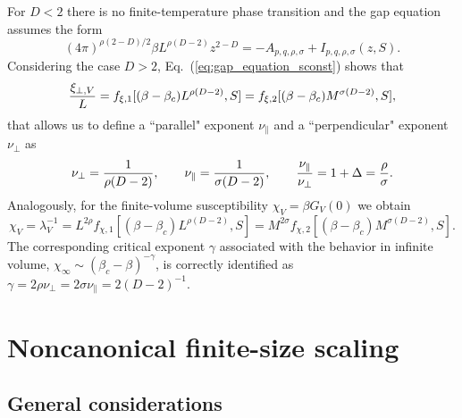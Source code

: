 \documentclass[a4paper,12pt]{article}
\begin{document}
For $D<2$ there is no finite-temperature phase transition and the gap equation
assumes the form
\begin{equation}
\label{eq:gap_equation_sconst2}
(4\pi)^{\rho(2-D)/2}  \beta L^{\rho(D-2)} z^{2-D} =
- A_{p,q,\rho,\sigma} + I_{p,q,\rho,\sigma}(z,S).
\end{equation} 
Considering the case $D>2$, 
Eq.~(\ref{eq:gap_equation_sconst}) shows that
\begin{equation}
{\xi_{\bot,V}\over L} = f_{\xi,1}[
   (\beta - \beta_c) L^{\rho(D-2)},S] = 
   f_{\xi,2}[
   (\beta - \beta_c) M^{\sigma(D-2)},S] ,
\end{equation}
that allows us to define a ``parallel" exponent $\nu_\| $ and a 
``perpendicular" exponent $\nu_\bot$ as 
\begin{equation}
 \nu_\bot = {1\over \rho(D-2)}, \qquad
 \nu_\| = {1\over \sigma(D-2)}, \qquad
 {\nu_\| \over \nu_\bot} = 1 + \Delta = {\rho\over \sigma}.
\end{equation}
Analogously, for the finite-volume susceptibility 
$\chi_{V} = \beta \widehat G_{V}(0)$ we obtain 
\begin{equation}
\chi_{V} = \lambda_V^{-1} = L^{2\rho} f_{\chi,1}[
   (\beta - \beta_c) L^{\rho(D-2)},S] =
   M^{2\sigma} f_{\chi,2}[
   (\beta - \beta_c) M^{\sigma(D-2)},S].
\label{chi-scaling}
\end{equation}
The corresponding critical exponent $\gamma$ associated with the behavior in
infinite volume, $\chi_\infty\sim (\beta_c - \beta)^{-\gamma}$,
is correctly identified as 
$\gamma = 2 \rho \nu_\bot = 2 \sigma \nu_{\|} = 2(D-2)^{-1}$.

\section{Noncanonical finite-size scaling} \label{sec4}

\subsection{General considerations} \label{sec4.1}
\end{document}
